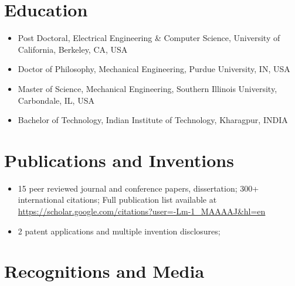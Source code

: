 \documentclass[letterpaper,11pt]{article}
\begin{document}
{\section{Education}}
\begin{itemize}%
 \setlength{\itemsep}{0pt}
 \item Post Doctoral, Electrical Engineering \& Computer Science, University of California, Berkeley, CA, USA
\item Doctor of Philosophy, Mechanical Engineering, Purdue University, IN, USA
\item Master of Science, Mechanical Engineering, Southern Illinois University, Carbondale, IL, USA
\item Bachelor of Technology, Indian Institute of Technology, Kharagpur, INDIA

\end{itemize}

    {\section{Publications and Inventions}}
    \begin{itemize}%
 \setlength{\itemsep}{0pt}
 \item 15 peer reviewed journal and conference papers, dissertation; 300+ international citations; Full publication list available at \url{https://scholar.google.com/citations?user=-Lm-1_MAAAAJ&hl=en}
 \item 2 patent applications and multiple invention disclosures; 
 
\end{itemize}


{\section{Recognitions and Media}}
\end{document}
